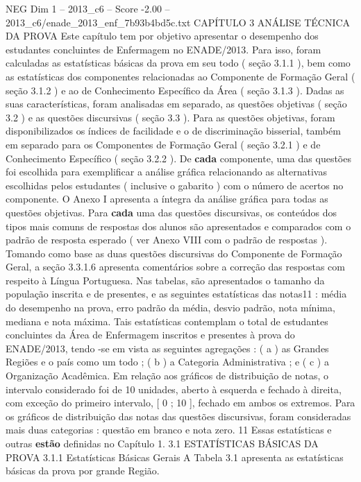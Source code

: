 \begin{textsample}{NEG Dim 1 – 2013\_c6 – Score -2.00 – 2013\_c6/enade\_2013\_enf\_7b93b4bd5c.txt}  \label{ex:f1_neg_267}
CAPÍTULO 3 ANÁLISE TÉCNICA DA PROVA Este capítulo tem por objetivo apresentar o desempenho dos estudantes concluintes de Enfermagem no ENADE/2013.
Para isso, foram calculadas as estatísticas básicas da prova em seu todo ( seção 3.1.1 ), bem como as estatísticas dos componentes relacionadas ao Componente de Formação Geral ( seção 3.1.2 ) e ao de Conhecimento Específico da Área ( seção 3.1.3 ).
Dadas as suas características, foram analisadas em separado, as questões objetivas ( seção 3.2 ) e as questões discursivas ( seção 3.3 ).
Para as questões objetivas, foram disponibilizados os índices de facilidade e o de discriminação bisserial, também em separado para os Componentes de Formação Geral ( seção 3.2.1 ) e de Conhecimento Específico ( seção 3.2.2 ).
De \textbf{cada} componente, uma das questões foi escolhida para exemplificar a análise gráfica relacionando as alternativas escolhidas pelos estudantes ( inclusive o gabarito ) com o número de acertos no componente.
O Anexo I apresenta a íntegra da análise gráfica para todas as questões objetivas.
Para \textbf{cada} uma das questões discursivas, os conteúdos dos tipos mais comuns de respostas dos alunos são apresentados e comparados com o padrão de resposta esperado ( ver Anexo VIII com o padrão de respostas ).
Tomando como base as duas questões discursivas do Componente de Formação Geral, a seção 3.3.1.6 apresenta comentários sobre a correção das respostas com respeito à Língua Portuguesa.
Nas tabelas, são apresentados o tamanho da população inscrita e de presentes, e as seguintes estatísticas das notas11 : média do desempenho na prova, erro padrão da média, desvio padrão, nota mínima, mediana e nota máxima.
Tais estatísticas contemplam o total de estudantes concluintes da Área de Enfermagem inscritos e presentes à prova do ENADE/2013, tendo -se em vista as seguintes agregações : ( a ) as Grandes Regiões e o país como um todo ; ( b ) a Categoria Administrativa ; e ( c ) a Organização Acadêmica.
Em relação aos gráficos de distribuição de notas, o intervalo considerado foi de 10 unidades, aberto à esquerda e fechado à direita, com exceção do primeiro intervalo, [ 0 ; 10 ], fechado em ambos os extremos.
Para os gráficos de distribuição das notas das questões discursivas, foram consideradas mais duas categorias : questão em branco e nota zero. 11 Essas estatísticas e outras \textbf{estão} definidas no Capítulo 1. 3.1 ESTATÍSTICAS BÁSICAS DA PROVA 3.1.1 Estatísticas Básicas Gerais A Tabela 3.1 apresenta as estatísticas básicas da prova por grande Região.

\end{textsample}

